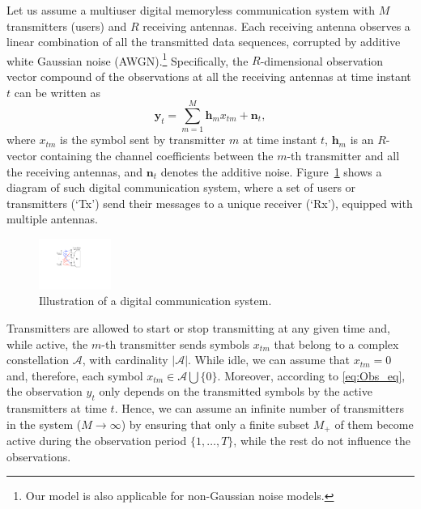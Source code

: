 \documentclass[a4paper]{article}
\def\yt{\mathbf{y}_t}
\def\nt{\mathbf{n}_t}
\def\hm{\mathbf{h}_m}
\def\xtm{x_{tm}}
\def\Acal{\mathcal{A}}
\begin{document}
Let us assume a multiuser digital memoryless communication system with $M$ transmitters (users) and $R$ receiving antennas. Each receiving antenna observes a linear combination of all the transmitted data sequences, corrupted by additive white Gaussian noise (AWGN).\footnote{Our model is also applicable for non-Gaussian noise models.} Specifically, the $R$-dimensional observation vector compound of the observations at all the receiving antennas at time instant $t$ can be written as
\begin{equation}
\yt = \sum_{m=1}^{M} \hm \xtm+\nt, \label{eq:Obs_eq}
\end{equation}
where $\xtm$ is the symbol sent by transmitter $m$ at time instant $t$, $\hm$ is an $R$-vector containing the channel coefficients between the $m$-th transmitter and all the receiving antennas, and $\nt$ denotes the additive noise. Figure~\ref{fig:MIMOchannel} shows a diagram of such digital communication system, where a set of users or transmitters (`Tx') send their messages to a unique receiver (`Rx'), equipped with multiple antennas.

\begin{figure}[h]
\centering
\includegraphics[width=0.21\textwidth]{figures/MIMOchannel.pdf}
\caption{Illustration of a digital communication system.}\label{fig:MIMOchannel}
\end{figure}

Transmitters are allowed to start or stop transmitting at any given time and, while active, the $m$-th transmitter sends symbols $\xtm$ that belong to a complex constellation $\Acal$, with cardinality $|\Acal|$. While idle, we can assume that $\xtm=0$ and, therefore, each symbol $\xtm\in\Acal \bigcup \{0\}$. Moreover, according to \eqref{eq:Obs_eq}, the observation $y_t$ only depends on the transmitted symbols by the active transmitters at time $t$.  Hence, we can assume an infinite number of transmitters in the system ($M\rightarrow\infty$) by ensuring that only a finite subset $M_+$ of them become active during the observation period $\{1,\ldots,T\}$, while the rest do not influence the observations.
\end{document}
